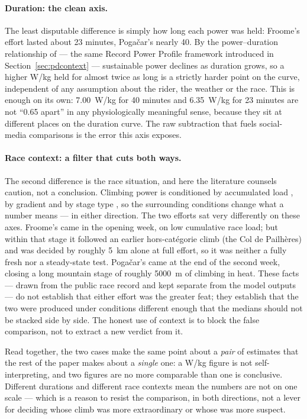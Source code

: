 \documentclass[11pt]{article}
\begin{document}
\paragraph{Duration: the clean axis.}
The least disputable difference is simply how long each power was held: Froome's
effort lasted about \num{23} minutes, Pogačar's nearly \num{40}. By the
power--duration relationship of \citet{pinot2011} --- the same Record Power
Profile framework introduced in Section~\ref{sec:pdcontext} --- sustainable power
declines as duration grows, so a higher W/kg held for almost twice as long is a
strictly harder point on the curve, independent of any assumption about the rider,
the weather or the race. This is enough on its own: \num{7.00}~W/kg for \num{40}
minutes and \num{6.35}~W/kg for \num{23} minutes are not ``\num{0.65} apart'' in
any physiologically meaningful sense, because they sit at different places on the
duration curve. The raw subtraction that fuels social-media comparisons is the
error this axis exposes.

\paragraph{Race context: a filter that cuts both ways.}
The second difference is the race situation, and here the literature counsels
caution, not a conclusion. Climbing power is conditioned by accumulated load
\citep{leo2022}, by gradient \citep{valenzuela2022} and by stage type
\citep{sanders2021}, so the surrounding conditions change what a number means ---
in either direction. The two efforts sat very differently on these axes. Froome's
came in the opening week, on low cumulative race load; but within that stage it
followed an earlier hors-cat\'egorie climb (the Col de Pailh\`eres) and was
decided by roughly \SI{5}{\km} alone at full effort, so it was neither a
fully fresh nor a steady-state test. Pogačar's came at the end of the second week,
closing a long mountain stage of roughly \SI{5000}{\meter} of climbing in heat.
These facts --- drawn from the public race record and kept separate from the model
outputs --- do not establish that either effort was the greater feat; they
establish that the two were produced under conditions different enough that the
medians should not be stacked side by side. The honest use of context is to block
the false comparison, not to extract a new verdict from it.

Read together, the two cases make the same point about a \emph{pair} of estimates
that the rest of the paper makes about a \emph{single} one: a W/kg figure is not
self-interpreting, and two figures are no more comparable than one is conclusive.
Different durations and different race contexts mean the numbers are not on one
scale --- which is a reason to resist the comparison, in both directions, not a
lever for deciding whose climb was more extraordinary or whose was more suspect.
\end{document}

